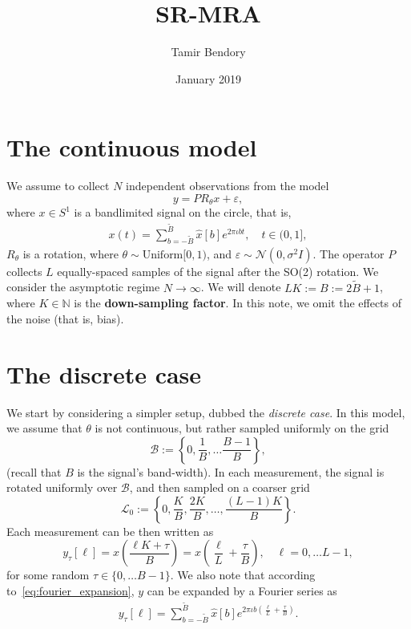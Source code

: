\documentclass[english,12pt]{article}
\newcommand{\I}{\iota}
\newcommand{\tB}{\tilde{B}}
\begin{document}
\title{SR-MRA}

\author{Tamir Bendory}
\date{January 2019}
\maketitle

\section{The continuous model}

We assume to collect $N$ independent observations from the model 
\begin{equation}
y = PR_\theta x + \varepsilon,
\end{equation}
where $x\in S^1$ is a bandlimited signal on the circle, that is, 
\begin{eqnarray} \label{eq:fourier_expansion}
x(t) = \sum_{b=-\tB}^{\tB}\hat{x}[b]e^{2\pi\I bt }, \quad t\in(0,1],
\end{eqnarray}
$R_\theta$ is a rotation, where $\theta\sim \text{Uniform}[0,1)$, and $\varepsilon\sim\mathcal{N}(0,\sigma^2 I)$. 
The operator $P$ collects $L$ equally-spaced samples of the signal after the SO(2) rotation. We consider the asymptotic regime $N\to \infty$. We will denote $LK := B := 2\tB+1$, where $K\in\mathbb{N}$ is the \textbf{down-sampling factor}.
In this note, we omit the effects of the noise (that is, bias).

\section{The discrete case}

We start by considering a simpler setup, dubbed the \emph{discrete case}. In this model, we assume that $\theta$ is not continuous, but rather sampled uniformly on the grid $$\mathcal{B}:=\left\{0,\frac{1}{B},\ldots\frac{B-1}{B}\right\},$$ (recall that $B$ is the signal's band-width). 
In each measurement, the signal is rotated uniformly over  $\mathcal{B}$, and then sampled on a coarser grid $$\mathcal{L}_0:=\left\{0,\frac{K}{B},\frac{2K}{B},\ldots,\frac{(L-1)K}{B}\right\}.$$ 
Each measurement can be then written as
\begin{equation}
y_\tau[\ell] = x\left(\frac{\ell K+\tau}{B}\right)=x\left(\frac{\ell}{L} + \frac{\tau}{B}\right), \quad \ell=0,\ldots L-1,
\end{equation}
for some random $\tau\in\{0,\ldots B-1\}$. 
We also note that according to~\eqref{eq:fourier_expansion},  $y$ can be expanded by a Fourier series as
\begin{eqnarray}
y_\tau[\ell] = \sum_{b=-\tB}^{\tB}\hat{x}[b]e^{2\pi\I b \left(\frac{\ell}{L} + \frac{\tau}{B}\right) }.
\end{eqnarray}
\end{document}
